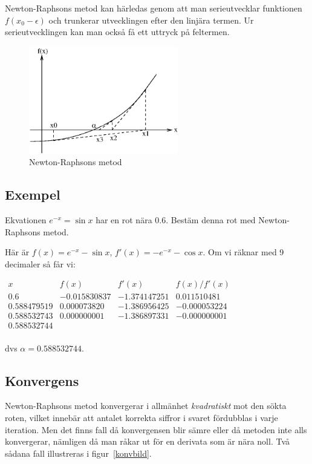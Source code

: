 \documentclass[a4paper]{article}
\begin{document}
Newton-Raphsons metod kan härledas genom att man serieutvecklar
funktionen $f(x_0-\epsilon)$ och trunkerar utvecklingen efter den linjära
termen. Ur serieutvecklingen kan man också få ett uttryck på
feltermen.

\begin{figure}
   \begin{center}
      \includegraphics[width=65mm]{nrbild}
   \end{center}
   \caption{Newton-Raphsons metod}
   \label{nrbild}
\end{figure}


\subsection{Exempel}

Ekvationen $e^{-x} = \sin x$ har en rot nära $0.6$. Bestäm denna rot med
Newton-Raphsons metod.

\newpage
Här är $f(x) = e^{-x} - \sin x$, $f'(x) = -e^{-x} - \cos x$. Om vi räknar
med 9 decimaler så får vi:

\medskip
$\begin{array}{llll}
      x           & f(x)         & f'(x)        & f(x)/f'(x)   \\
      0.6         & -0.015830837 & -1.374147251 & 0.011510481  \\
      0.588479519 & 0.000073820  & -1.386956425 & -0.000053224 \\
      0.588532743 & 0.000000001  & -1.386897331 & -0.000000001 \\
      0.588532744                                              \\
   \end{array}$

\medskip
\noindent dvs $\alpha = 0.588532744$.



\subsection{Konvergens}
\label{sec:konv}
Newton-Raphsons metod konvergerar i allmänhet \emph{kvadratiskt} mot den
sökta roten, vilket innebär att antalet korrekta siffror i svaret
fördubblas i varje iteration. Men det finns fall då konvergensen
blir sämre eller då metoden inte alls konvergerar, nämligen då man
råkar ut för en derivata som är nära noll. Två sådana fall illustreras
i figur~\ref{konvbild}.
\end{document}
